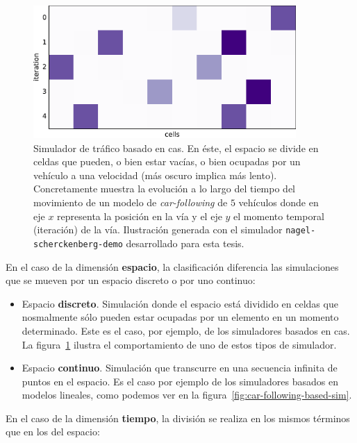 \begin{figure}
	\centering
	\includegraphics[width=10cm]{images/cellular-automata-based-sim}
	\caption{Simulador de tráfico basado en \acp{ca}. En éste, el espacio se divide en celdas que pueden, o bien estar vacías, o bien ocupadas por un vehículo a una velocidad (más oscuro implica más lento). Concretamente muestra la evolución a lo largo del tiempo del movimiento de un modelo de \textit{car-following} de $5$ vehículos donde en eje $x$ representa la posición en la vía y el eje $y$ el momento temporal (iteración) de la vía. Ilustración generada con el simulador \texttt{nagel-scherckenberg-demo} desarrollado para esta tesis.}
	\label{fig:cellular-automata-based-sim}
\end{figure}

En el caso de la dimensión \textbf{espacio}, la clasificación diferencia las simulaciones que se mueven por un espacio discreto o por uno continuo:

\begin{itemize}
	\item Espacio \textbf{discreto}. Simulación donde el espacio está dividido en celdas que nosmalmente sólo pueden estar ocupadas por un elemento en un momento determinado. Este es el caso, por ejemplo, de los simuladores basados en \acp{ca}. La figura~\ref{fig:cellular-automata-based-sim} ilustra el comportamiento de uno de estos tipos de simulador.
	\item Espacio \textbf{continuo}. Simulación que transcurre en una secuencia infinita de puntos en el espacio. Es el caso por ejemplo de los simuladores basados en modelos lineales, como podemos ver en la figura~\ref{fig:car-following-based-sim}.
\end{itemize}

En el caso de la dimensión \textbf{tiempo}, la división se realiza en los mismos términos que en los del espacio:

